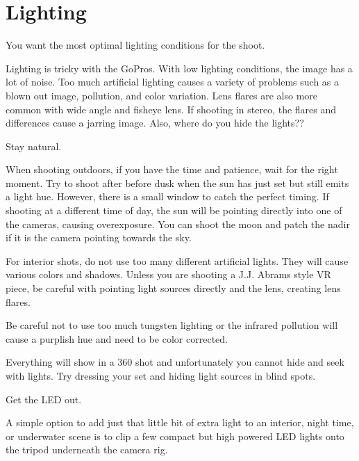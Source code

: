 \chapter{Lighting}
\pagecolor{white}
\label{chap:25}
\begin{fullwidth}


\problem

{\large You want the most optimal lighting conditions for the shoot. \par}

Lighting is tricky with the GoPros. With low lighting conditions, the image has a lot of noise. Too much artificial lighting causes a variety of problems such as a blown out image, pollution, and color variation. Lens flares are also more common with wide angle and fisheye lens. If shooting in stereo, the flares and differences cause a jarring image. Also, where do you hide the lights??

\solution

{\large Stay natural. \par}

When shooting outdoors, if you have the time and patience, wait for the right moment. Try to shoot after before dusk when the sun has just set but still emits a light hue. However, there is a small window to catch the perfect timing. If shooting at a different time of day, the sun will be pointing directly into one of the cameras, causing overexposure. You can shoot the moon and patch the nadir if it is the camera pointing towards the sky. 

For interior shots, do not use too many different artificial lights. They will cause various colors and shadows. Unless you are shooting a J.J. Abrams style VR piece, be careful with pointing light sources directly and the lens, creating lens flares.

Be careful not to use too much tungsten lighting or the infrared pollution will cause a purplish hue and need to be color corrected. 


Everything will show in a 360 shot and unfortunately you cannot hide and seek with lights. Try dressing your set and hiding light sources in blind spots. 


{\large Get the LED out. \par}

A simple option to add just that little bit of extra light to an interior, night time, or underwater scene is to clip a few compact but high powered LED lights onto the tripod underneath the camera rig.


\end{fullwidth}
